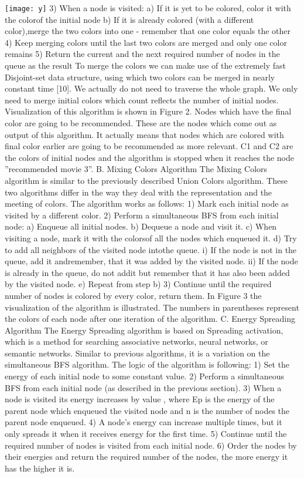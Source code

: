 \documentclass[10pt,slovak,a4paper]{article}
\begin{document}
\begin{multicols}{2}
  \texttt{[image: y]}
   3)	When a node is visited:
a)	If it is yet to be colored, color it with the colorof the initial node
b)	If it is already colored (with a different color),merge the two colors into one - remember that one color equals the other
4)	Keep merging colors until the last two colors are merged and only one color remains
5)	Return the current and the next required number of nodes in the queue as the result
To merge the colors we can make use of the extremely fast Disjoint-set data structure, using which two colors can be merged in nearly constant time [10]. We actually do not need to traverse the whole graph. We only need to merge initial colors which count reflects the number of initial nodes.
Visualization of this algorithm is shown in Figure 2. Nodes which have the final color are going to be recommended. These are the nodes which come out as output of this algorithm. It actually means that nodes which are colored with final color earlier are going to be recommended as more relevant. C1 and C2 are the colors of initial nodes and the algorithm is stopped when it reaches the node ”recommended movie 3”.
B. Mixing Colors Algorithm
The Mixing Colors algorithm is similar to the previously described Union Colors algorithm. These two algorithms differ in the way they deal with the representation and the meeting of colors.
The algorithm works as follows:
1) Mark each initial node as visited by a different color. 2) Perform a simultaneous BFS from each initial node:
a)	Enqueue all initial nodes.
b)	Dequeue a node and visit it.
c)	When visiting a node, mark it with the colorsof all the nodes which enqueued it.
d)	Try to add all neighbors of the visited node intothe queue.
i)	If the node is not in the queue, add it andremember, that it was added by the visited node.
ii)	If the node is already in the queue, do not addit but remember that it has also been added by the visited node.
e)	Repeat from step b)
3) Continue until the required number of nodes is colored by every color, return them.
In Figure 3 the visualization of the algorithm is illustrated. The numbers in parentheses represent the colors of each node after one iteration of the algorithm.
C. Energy Spreading Algorithm
The Energy Spreading algorithm is based on Spreading activation, which is a method for searching associative networks, neural networks, or semantic networks. Similar to previous algorithms, it is a variation on the simultaneous BFS algorithm. The logic of the algorithm is following:
1)	Set the energy of each initial node to some constant value.
2)	Perform a simultaneous BFS from each initial node (as described in the previous section).
3)	When a node is visited its energy increases by value
 , where Ep is the energy of the parent node which enqueued the visited node and n is the number of nodes the parent node enqueued.
4)	A node’s energy can increase multiple times, but it only spreads it when it receives energy for the first time.
5)	Continue until the required number of nodes is visited from each initial node.
6)	Order the nodes by their energies and return the required number of the nodes, the more energy it has the higher it is.


\end{multicols}
\end{document}
